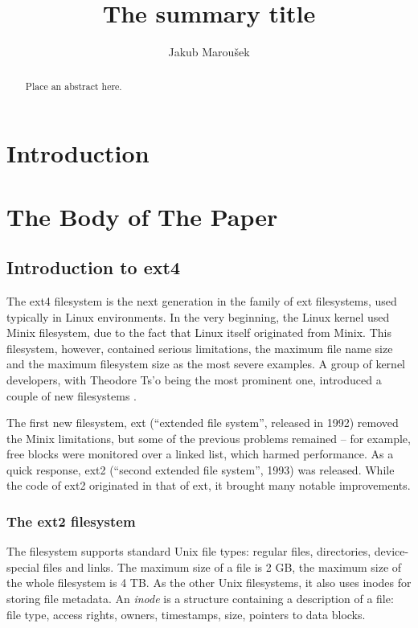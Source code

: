 \documentclass{acm_proc_article-sp}
\begin{document}
\title{The summary title}

\author{
\alignauthor
Jakub Marou\v sek
}

\maketitle
\begin{abstract}
Place an abstract here.
\end{abstract}

\section{Introduction}

\cite{braams:babel}

\section{The {\secit Body} of The Paper}

\subsection{Introduction to ext4}

The ext4 filesystem is the next generation in the family of ext filesystems, used typically in Linux environments. In the very beginning, the Linux kernel used Minix filesystem, due to the fact that Linux itself originated from Minix. This filesystem, however, contained serious limitations, the maximum file name size and the maximum filesystem size as the most severe examples. A group of kernel developers, with Theodore Ts'o being the most prominent one, introduced a couple of new filesystems \cite{ext2design}.

The first new filesystem, ext (``extended file system'', released in 1992) removed the Minix limitations, but some of the previous problems remained -- for example, free blocks were monitored over a linked list, which harmed performance. As a quick response, ext2 (``second extended file system'', 1993) was released. While the code of ext2 originated in that of ext, it brought many notable improvements.

\subsubsection{The ext2 filesystem}

The filesystem supports standard Unix file types: regular files, directories, device-special files and links. The maximum size of a file is 2 GB, the maximum size of the whole filesystem is 4 TB.
As the other Unix filesystems, it also uses inodes for storing file metadata. An {\it inode} is a structure containing a description of a file: file type, access rights, owners, timestamps, size, pointers to data blocks.
\end{document}
